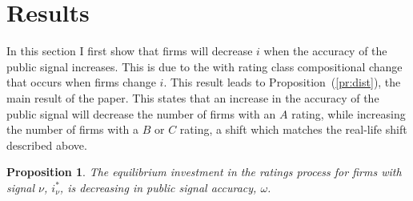 \documentclass[notitlepage]{article}
\newtheorem{proposition}{Proposition}
\begin{document}
\section{Results}
\label{sec:res}%

In this section I first show that firms will decrease $i$ when the accuracy of the public signal increases. This is due to the with rating class compositional change that occurs when firms change $i$. This result leads to Proposition~(\ref{pr:dist}), the main result of the paper. This states that an increase in the accuracy of the public signal will decrease the number of firms with an $A$ rating, while increasing the number of firms with a $B$ or $C$ rating, a shift which matches the real-life shift described above. 
\begin{proposition}
\label{pr:pi}
The equilibrium investment in the ratings process for firms with signal $\nu$, $i^{*}_{\nu}$, is decreasing in public signal accuracy, $\omega$.
\end{proposition}
\end{document}
